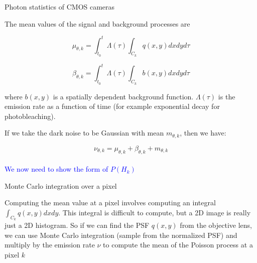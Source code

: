 \documentclass[aspectratio=1610]{beamer}					%
\begin{document}
\begin{frame}{Photon statistics of CMOS cameras}

The mean values of the signal and background processes are

\begin{equation*}
\mu_{\theta,k} = \int_{t_{0}}^{t} \Lambda(\tau) \int_{C_{k}} q(x,y)dxdyd\tau
\end{equation*}

\begin{equation*}
\beta_{\theta,k} = \int_{t_{0}}^{t} \Lambda(\tau) \int_{C_{k}} b(x,y)dxdyd\tau
\end{equation*}

where $b(x,y)$ is a spatially dependent background function. $\Lambda(\tau)$ is the emission rate as a function of time (for example exponential decay for photobleaching). 

If we take the dark noise to be Gaussian with mean $m_{\theta,k}$, then we have: 

\begin{equation*}
\nu_{\theta,k} = \mu_{\theta,k} + \beta_{\theta,k} + m_{\theta,k}
\end{equation*}
\\
\vspace{0.2in}
\textcolor{blue}{We now need to show the form of $P(H_{k})$}


\end{frame}

\begin{frame}{Monte Carlo integration over a pixel}

Computing the mean value at a pixel involves computing an integral $ \int_{C_{k}} q(x,y)dxdy$. This integral is difficult to compute, but a 2D image is really just a 2D histogram. So if we can find the PSF $q(x,y)$ from the objective lens, we can use Monte Carlo integration (sample from the normalized PSF) and multiply by the emission rate $\nu$ to compute the mean of the Poisson process at a pixel $k$


\end{frame}
\end{document}
